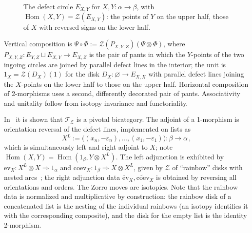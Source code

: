 \documentclass[11pt]{article}
\theoremstyle{definition}
\newcommand{\cT}{\mathcal{T}}
\newcommand{\cZ}{\mathcal{Z}}
\begin{document}
\begin{figure}[ht]
\centering
{}
\caption{The defect circle $E_{X,Y}$ for $X, Y \colon \alpha \to \beta$, with $\operatorname{Hom}(X,Y) = \cZ(E_{X,Y})$: the points of $Y$ on the upper half, those of $X$ with reversed signs on the lower half.}
\label{fig:EXY}
\end{figure} Vertical composition is $\Psi \circ \Phi := \cZ(P_{X,Y,Z})(\Psi \otimes \Phi)$, where $P_{X,Y,Z} \colon E_{Y,Z} \sqcup E_{X,Y} \to E_{X,Z}$ is the pair of pants in which the $Y$-points of the two ingoing circles are joined by parallel defect lines in the interior; the unit is $1_X = \cZ(D_X)(1)$ for the disk $D_X \colon \varnothing \to E_{X,X}$ with parallel defect lines joining the $X$-points on the lower half to those on the upper half. Horizontal composition of 2-morphisms uses a second, differently decorated pair of pants. Associativity and unitality follow from isotopy invariance and functoriality.

In~\cite{DKR11} it is shown that $\cT_\cZ$ is a pivotal bicategory. The adjoint of a 1-morphism is orientation reversal of the defect lines, implemented on lists as
\begin{equation}
  X^L := \big((x_n, -\varepsilon_n), \dots, (x_1, -\varepsilon_1)\big) \colon \beta \longrightarrow \alpha \, ,
\end{equation}
which is simultaneously left and right adjoint to $X$; note $\operatorname{Hom}(X,Y) = \operatorname{Hom}(1_\beta, Y \otimes X^L)$. The left adjunction is exhibited by $\mathrm{ev}_X \colon X^L \otimes X \Rightarrow 1_\alpha$ and $\mathrm{coev}_X \colon 1_\beta \Rightarrow X \otimes X^L$, given by $\cZ$ of ``rainbow'' disks with nested arcs~\cite[eqs.~(2.18), (2.19)]{Car16}; the right adjunction data $\widetilde{\mathrm{ev}}_X, \widetilde{\mathrm{coev}}_X$ is obtained by reversing all orientations and orders. The Zorro moves are isotopies. Note that the rainbow data is normalized and multiplicative by construction: the rainbow disk of a concatenated list is the nesting of the individual rainbows (an isotopy identifies it with the corresponding composite), and the disk for the empty list is the identity 2-morphism.
\end{document}
